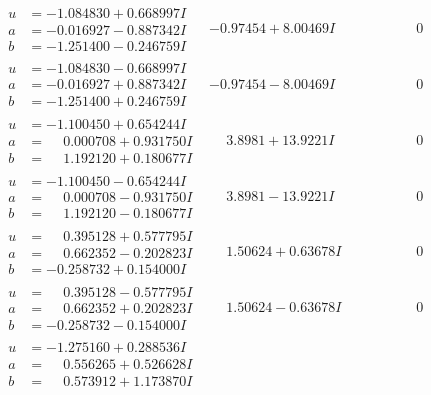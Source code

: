 \documentclass[1p]{elsarticle_modified}
\theoremstyle{definition}
\begin{document}
$$\begin{array}{c|c|c}
 \hline 
\begin{aligned}
u &= -1.084830 + 0.668997 I \\
a &= -0.016927 - 0.887342 I \\
b &= -1.251400 - 0.246759 I\end{aligned}
 & -0.97454 + 8.00469 I & \phantom{-0.000000 } 0 \\ \hline\begin{aligned}
u &= -1.084830 - 0.668997 I \\
a &= -0.016927 + 0.887342 I \\
b &= -1.251400 + 0.246759 I\end{aligned}
 & -0.97454 - 8.00469 I & \phantom{-0.000000 } 0 \\ \hline\begin{aligned}
u &= -1.100450 + 0.654244 I \\
a &= \phantom{-}0.000708 + 0.931750 I \\
b &= \phantom{-}1.192120 + 0.180677 I\end{aligned}
 & \phantom{-}3.8981 + 13.9221 I & \phantom{-0.000000 } 0 \\ \hline\begin{aligned}
u &= -1.100450 - 0.654244 I \\
a &= \phantom{-}0.000708 - 0.931750 I \\
b &= \phantom{-}1.192120 - 0.180677 I\end{aligned}
 & \phantom{-}3.8981 - 13.9221 I & \phantom{-0.000000 } 0 \\ \hline\begin{aligned}
u &= \phantom{-}0.395128 + 0.577795 I \\
a &= \phantom{-}0.662352 - 0.202823 I \\
b &= -0.258732 + 0.154000 I\end{aligned}
 & \phantom{-}1.50624 + 0.63678 I & \phantom{-0.000000 } 0 \\ \hline\begin{aligned}
u &= \phantom{-}0.395128 - 0.577795 I \\
a &= \phantom{-}0.662352 + 0.202823 I \\
b &= -0.258732 - 0.154000 I\end{aligned}
 & \phantom{-}1.50624 - 0.63678 I & \phantom{-0.000000 } 0 \\ \hline\begin{aligned}
u &= -1.275160 + 0.288536 I \\
a &= \phantom{-}0.556265 + 0.526628 I \\
b &= \phantom{-}0.573912 + 1.173870 I\end{aligned}

\end{array}$$
\end{document}
